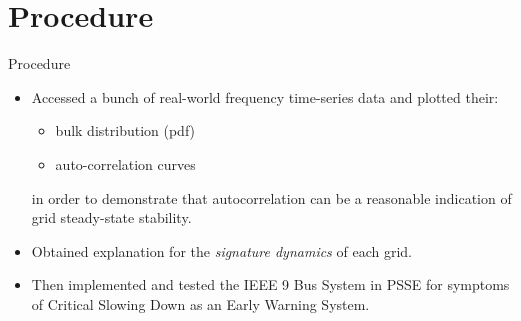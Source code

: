 \section[Procedure]{Procedure}
\label{sec:procedure}

\begin{frame}{Procedure}
	\begin{itemize}
		\item Accessed a bunch of real-world frequency time-series data and plotted their:
			\begin{itemize}
				\item bulk distribution (pdf) 
				\item auto-correlation curves
			\end{itemize}
		in order to demonstrate that autocorrelation can be a reasonable indication of grid steady-state stability.
		\item Obtained explanation for the \textit{signature dynamics}	of each grid.
		\item Then implemented and tested the IEEE 9 Bus System in PSSE for symptoms of Critical Slowing Down as an Early Warning System. 		
	\end{itemize}
\end{frame}